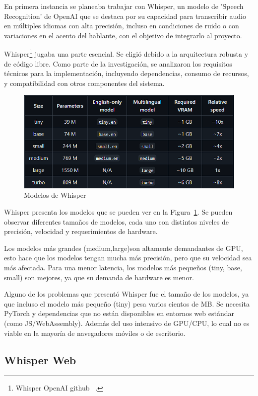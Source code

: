 \documentclass[a4paper, 12pt]{book}
\begin{document}
En primera instancia se planeaba trabajar con Whisper, un modelo de 'Speech Recognition' de OpenAI que se destaca por su capacidad para transcribir audio en múltiples idiomas con alta precisión, incluso en condiciones de ruido o con variaciones en el acento del hablante, con el objetivo de integrarlo al proyecto.

Whisper\footnote{Whisper OpenAI github ~\cite{whisper}.} jugaba una parte esencial. Se eligió debido a la arquitectura robusta y de código libre. Como parte de la investigación, se analizaron los requisitos técnicos para la implementación, incluyendo dependencias, consumo de recursos, y compatibilidad con otros componentes del sistema.

\begin{figure}[H]
    \centering
    \includegraphics[width=0.8\linewidth]{img/Whisper_github.png}
    \caption{Modelos de Whisper}
    \label{fig:models-Whisper}
\end{figure}

Whisper presenta los modelos que se pueden ver en la Figura~\ref{fig:models-Whisper}. Se pueden observar diferentes tamaños de modelos, cada uno con distintos niveles de precisión, velocidad y requerimientos de hardware.

Los modelos más grandes (medium,large)son altamente demandantes de GPU, esto hace que los modelos tengan mucha más precisión, pero que su velocidad sea más afectada. Para una menor latencia, los modelos más pequeños (tiny, base, small) son mejores, ya que su demanda de hardware es menor.

Alguno de los problemas que presentó Whisper fue el tamaño de los modelos, ya que incluso el modelo más pequeño (tiny) pesa varios cientos de MB. Se necesita PyTorch y dependencias que no están disponibles en entornos web estándar (como JS/WebAssembly). Además del uso intensivo de GPU/CPU, lo cual no es viable en la mayoría de navegadores móviles o de escritorio.

\subsection{Whisper Web}
\end{document}
